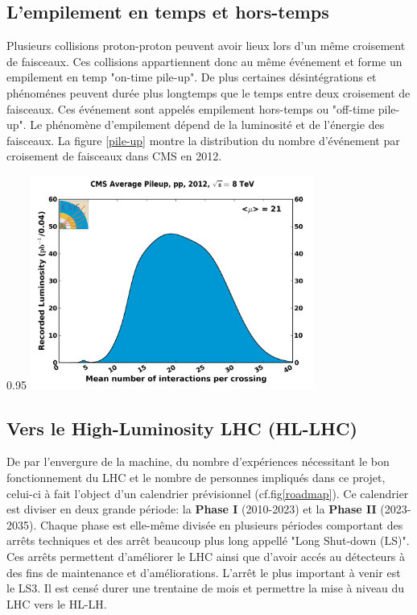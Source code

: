 \subsection{L'empilement en temps et hors-temps}
Plusieurs collisions proton-proton peuvent avoir lieux lors d'un même croisement de faisceaux. Ces collisions appartiennent donc au même événement et forme un empilement en temp "on-time pile-up". De plus certaines désintégrations et phénoménes peuvent durée plus longtemps que le temps entre deux croisement de faisceaux. Ces événement sont appelés empilement hors-temps ou "off-time pile-up". Le phénomène d'empilement dépend de la luminosité et de l'énergie des faisceaux. La figure \ref{pile-up} montre la distribution du nombre d'événement par croisement de faisceaux dans CMS en 2012.

\begin{minipagewithmarginpars}[h]{0.95\textwidth}
	\centering
	\includegraphics[width=0.7\textwidth]{LHC/pileup.png}
	\label{pile-up}	
\end{minipagewithmarginpars}

\subsection{Vers le High-Luminosity LHC (HL-LHC)}
De par l'envergure de la machine, du nombre d'expériences nécessitant le bon fonctionnement du LHC et le nombre de personnes impliqués dans ce projet, celui-ci à fait l'object d'un calendrier prévisionnel (cf.fig\ref{roadmap}). Ce calendrier est diviser en deux grande période: la \textbf{Phase I} (2010-2023) et la  \textbf{Phase II} (2023-2035). Chaque phase est elle-même divisée en plusieurs périodes comportant des arrêts techniques et des arrêt beaucoup plus long appellé "Long Shut-down (LS)". Ces arrêts permettent d'améliorer le LHC ainsi que d'avoir accés au détecteurs à des fins de maintenance et d'améliorations. L'arrêt le plus important à venir est le LS3. Il est censé durer une trentaine de mois et permettre la mise à niveau du LHC vers le HL-LH.

